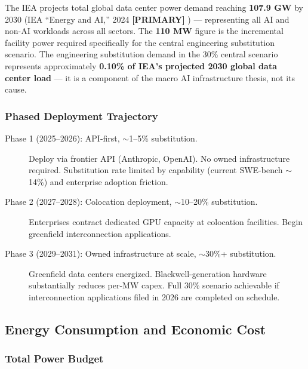 \documentclass{article}
\newcommand{\PRIMARY}{\textbf{[PRIMARY]}}
\begin{document}
\begin{tcolorbox}[warningbox, title={$\blacktriangleright$\ Note --- 108 GW vs.\ 110 MW}]
The IEA projects total global data center power demand reaching \textbf{107.9 GW} by
2030 (IEA ``Energy and AI,'' 2024 \PRIMARY{} \citep{iea2024energy}) --- representing all AI and non-AI
workloads across all sectors. The \textbf{110 MW} figure is the incremental facility
power required specifically for the central engineering substitution scenario. The
engineering substitution demand in the 30\% central scenario represents approximately
\textbf{0.10\% of IEA's projected 2030 global data center load} --- it is a component of
the macro AI infrastructure thesis, not its cause.
\end{tcolorbox}

\subsubsection{Phased Deployment Trajectory}

\begin{description}
  \item[Phase 1 (2025--2026): API-first, $\sim$1--5\% substitution.] Deploy via frontier
    API (Anthropic, OpenAI). No owned infrastructure required. Substitution rate limited
    by capability (current SWE-bench $\sim$14\%) and enterprise adoption friction.
  \item[Phase 2 (2027--2028): Colocation deployment, $\sim$10--20\% substitution.]
    Enterprises contract dedicated GPU capacity at colocation facilities. Begin greenfield
    interconnection applications.
  \item[Phase 3 (2029--2031): Owned infrastructure at scale, $\sim$30\%+ substitution.]
    Greenfield data centers energized. Blackwell-generation hardware substantially reduces
    per-MW capex. Full 30\% scenario achievable if interconnection applications filed in
    2026 are completed on schedule.
\end{description}

\subsection{Energy Consumption and Economic Cost}
\label{sec:energy}

\subsubsection{Total Power Budget}
\end{document}
